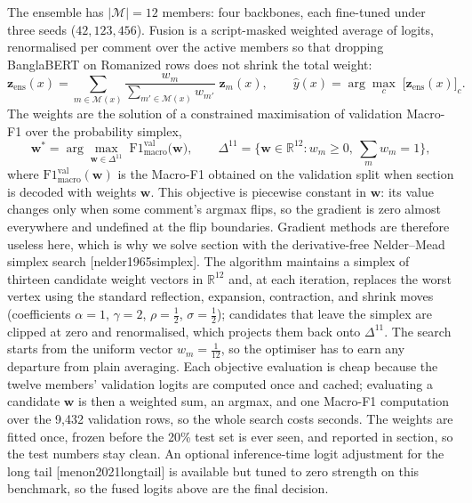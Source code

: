 \documentclass[11pt,a4paper]{article}
\def\citep#1{[#1]}%
\def\cref#1{section}%
\begin{document}
The ensemble has $|\mathcal{M}| = 12$ members: four backbones, each fine-tuned under three seeds ($42, 123, 456$). Fusion is a script-masked weighted average of logits, renormalised per comment over the active members so that dropping BanglaBERT on Romanized rows does not shrink the total weight:
\begin{equation}
\mathbf{z}_{\mathrm{ens}}(x) = \sum_{m \in \mathcal{M}(x)} \frac{w_m}{\sum_{m' \in \mathcal{M}(x)} w_{m'}}\; \mathbf{z}_m(x),
\qquad
\hat{y}(x) = \arg\max_{c}\; \big[\mathbf{z}_{\mathrm{ens}}(x)\big]_c.
\label{eq:fusion}
\end{equation}
The weights are the solution of a constrained maximisation of validation Macro-F1 over the probability simplex,
\begin{equation}
\mathbf{w}^{\ast} = \arg\max_{\mathbf{w} \in \Delta^{11}} \; \mathrm{F1}_{\mathrm{macro}}^{\mathrm{val}}\!\big(\mathbf{w}\big),
\qquad
\Delta^{11} = \Big\{ \mathbf{w} \in \mathbb{R}^{12} : w_m \ge 0,\ \textstyle\sum_{m} w_m = 1 \Big\},
\label{eq:weightopt}
\end{equation}
where $\mathrm{F1}_{\mathrm{macro}}^{\mathrm{val}}(\mathbf{w})$ is the Macro-F1 obtained on the validation split when \cref{eq:fusion} is decoded with weights $\mathbf{w}$. This objective is piecewise constant in $\mathbf{w}$: its value changes only when some comment's argmax flips, so the gradient is zero almost everywhere and undefined at the flip boundaries. Gradient methods are therefore useless here, which is why we solve \cref{eq:weightopt} with the derivative-free Nelder--Mead simplex search \citep{nelder1965simplex}. The algorithm maintains a simplex of thirteen candidate weight vectors in $\mathbb{R}^{12}$ and, at each iteration, replaces the worst vertex using the standard reflection, expansion, contraction, and shrink moves (coefficients $\alpha = 1$, $\gamma = 2$, $\rho = \tfrac{1}{2}$, $\sigma = \tfrac{1}{2}$); candidates that leave the simplex are clipped at zero and renormalised, which projects them back onto $\Delta^{11}$. The search starts from the uniform vector $w_m = \tfrac{1}{12}$, so the optimiser has to earn any departure from plain averaging. Each objective evaluation is cheap because the twelve members' validation logits are computed once and cached; evaluating a candidate $\mathbf{w}$ is then a weighted sum, an argmax, and one Macro-F1 computation over the 9{,}432 validation rows, so the whole search costs seconds. The weights are fitted once, frozen before the 20\% test set is ever seen, and reported in \cref{sec:ensemble-results}, so the test numbers stay clean. An optional inference-time logit adjustment for the long tail \citep{menon2021longtail} is available but tuned to zero strength on this benchmark, so the fused logits above are the final decision.
\end{document}

